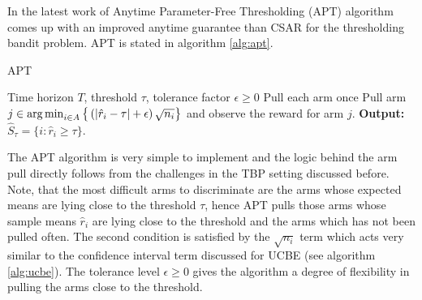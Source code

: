 In the latest work of \citet{locatelli2016optimal} Anytime Parameter-Free Thresholding (APT) algorithm comes up with an improved anytime guarantee than CSAR for the thresholding bandit problem. APT is stated in algorithm \ref{alg:apt}. 

\begin{algorithm}[!th]
\caption{APT}
\label{alg:apt}
\begin{algorithmic}
 Time horizon $T$, threshold $\tau$, tolerance factor $\epsilon\geq 0$
\State Pull each arm once
\State {}
\State Pull arm $j\in\operatorname*{arg\,min}_{i\in A}\big\lbrace \left(|\hat{r}_{i} - \tau | + \epsilon\right)\sqrt{n_i}\big\rbrace$ and observe the reward for arm $j$.
\EndFor
\State \textbf{Output:} $\hat{S}_{\tau}=\lbrace i: \hat{r}_{i}\geq \tau \rbrace$.
\end{algorithmic}
\end{algorithm}

The APT algorithm is very simple to implement and the logic behind the arm pull directly follows from the challenges in the TBP setting discussed before. Note, that the most difficult arms to discriminate are the arms whose expected means are lying close to the threshold $\tau$, hence APT pulls those arms whose sample means $\hat{r}_i$ are lying close to the threshold and the arms which has not been pulled often. The second condition is satisfied by the $\sqrt{n_i}$ term which acts very similar to the confidence interval term discussed for UCBE (see algorithm \ref{alg:ucbe}). The tolerance level $\epsilon\geq 0$ gives the algorithm a degree of flexibility in pulling the arms close to the threshold.